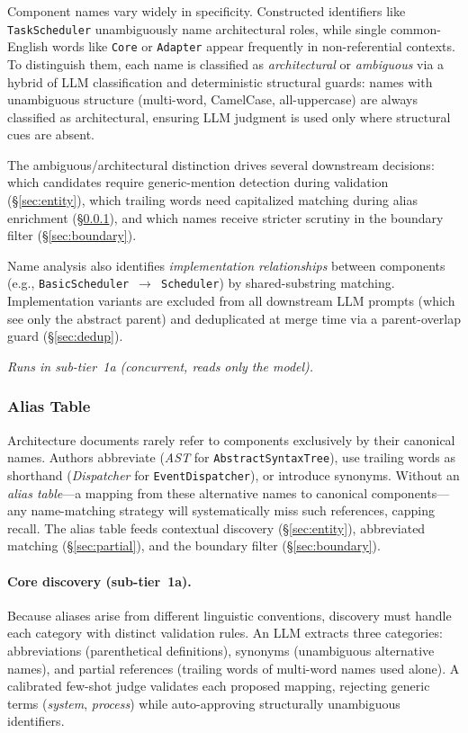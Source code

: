 Component names vary widely in specificity.
Constructed identifiers like \texttt{TaskScheduler} unambiguously name
architectural roles, while single common-English words like
\texttt{Core} or \texttt{Adapter} appear frequently in
non-referential contexts.
To distinguish them, each name is classified as \emph{architectural}
or \emph{ambiguous} via a hybrid of LLM classification and
deterministic structural guards: names with unambiguous structure
(multi-word, CamelCase, all-uppercase) are always classified as
architectural, ensuring LLM judgment is used only where structural
cues are absent.

The ambiguous/architectural distinction drives several downstream
decisions: which candidates require generic-mention detection during
validation (\S\ref{sec:entity}), which trailing words need
capitalized matching during alias enrichment (\S\ref{sec:alias}),
and which names receive stricter scrutiny in the boundary filter
(\S\ref{sec:boundary}).

Name analysis also identifies \emph{implementation relationships}
between components
(e.g., \texttt{BasicScheduler}~$\to$~\texttt{Scheduler})
by shared-substring matching.
Implementation variants are excluded from all downstream LLM prompts
(which see only the abstract parent) and deduplicated at merge time
via a parent-overlap guard (\S\ref{sec:dedup}).

\emph{Runs in sub-tier~1a (concurrent, reads only the model).}

\subsubsection{Alias Table}\label{sec:alias}

Architecture documents rarely refer to components exclusively by
their canonical names.
Authors abbreviate (\emph{AST} for \texttt{AbstractSyntaxTree}),
use trailing words as shorthand (\emph{Dispatcher} for
\texttt{EventDispatcher}), or introduce synonyms.
Without an \emph{alias table}---a mapping from these alternative
names to canonical components---any name-matching strategy will
systematically miss such references, capping recall.
The alias table feeds contextual discovery (\S\ref{sec:entity}),
abbreviated matching (\S\ref{sec:partial}), and the boundary filter
(\S\ref{sec:boundary}).

\paragraph{Core discovery (sub-tier~1a).}
Because aliases arise from different linguistic
conventions, discovery must handle each category with
distinct validation rules.
An LLM extracts three categories: abbreviations
(parenthetical definitions), synonyms (unambiguous alternative names),
and partial references (trailing words of multi-word names used
alone).
A calibrated few-shot judge validates each proposed mapping,
rejecting generic terms (\emph{system}, \emph{process}) while
auto-approving structurally unambiguous identifiers.

